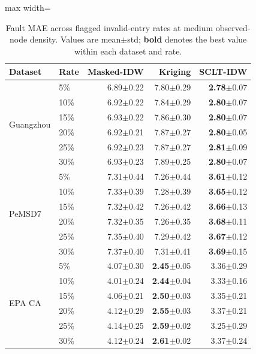 \begin{table}[htbp]
\centering
\caption{Fault MAE across flagged invalid-entry rates at medium observed-node density. Values are mean$\pm$std; \textbf{bold} denotes the best value within each dataset and rate.}
\label{tab:fault_rate_fault_mae_masked}
\TableFont
\setlength{\tabcolsep}{4pt}
\begin{adjustbox}{max width=\textwidth}
\begin{tabular}{llrrr}
\toprule
\rowcolor{TableHeader}
Dataset & Rate & Masked-IDW & Kriging & SCLT-IDW \\
\midrule
\multirow{6}{*}{Guangzhou} & 5\% & 6.89$\pm$0.22 & 7.80$\pm$0.29 & \textbf{2.78}$\pm$0.07 \\
 & 10\% & 6.92$\pm$0.22 & 7.84$\pm$0.29 & \textbf{2.80}$\pm$0.07 \\
 & 15\% & 6.93$\pm$0.22 & 7.86$\pm$0.30 & \textbf{2.80}$\pm$0.07 \\
 & 20\% & 6.92$\pm$0.21 & 7.87$\pm$0.27 & \textbf{2.80}$\pm$0.05 \\
 & 25\% & 6.92$\pm$0.23 & 7.87$\pm$0.27 & \textbf{2.81}$\pm$0.09 \\
 & 30\% & 6.93$\pm$0.23 & 7.89$\pm$0.25 & \textbf{2.80}$\pm$0.07 \\
\midrule
\multirow{6}{*}{PeMSD7} & 5\% & 7.31$\pm$0.44 & 7.26$\pm$0.44 & \textbf{3.61}$\pm$0.12 \\
 & 10\% & 7.33$\pm$0.39 & 7.28$\pm$0.39 & \textbf{3.65}$\pm$0.12 \\
 & 15\% & 7.32$\pm$0.42 & 7.26$\pm$0.42 & \textbf{3.66}$\pm$0.13 \\
 & 20\% & 7.32$\pm$0.35 & 7.26$\pm$0.35 & \textbf{3.68}$\pm$0.11 \\
 & 25\% & 7.35$\pm$0.40 & 7.29$\pm$0.42 & \textbf{3.67}$\pm$0.12 \\
 & 30\% & 7.37$\pm$0.40 & 7.31$\pm$0.41 & \textbf{3.69}$\pm$0.15 \\
\midrule
\multirow{6}{*}{EPA CA} & 5\% & 4.07$\pm$0.30 & \textbf{2.45}$\pm$0.05 & 3.36$\pm$0.29 \\
 & 10\% & 4.01$\pm$0.24 & \textbf{2.44}$\pm$0.04 & 3.33$\pm$0.16 \\
 & 15\% & 4.06$\pm$0.21 & \textbf{2.50}$\pm$0.03 & 3.35$\pm$0.21 \\
 & 20\% & 4.12$\pm$0.29 & \textbf{2.55}$\pm$0.03 & 3.37$\pm$0.21 \\
 & 25\% & 4.14$\pm$0.25 & \textbf{2.59}$\pm$0.02 & 3.25$\pm$0.29 \\
 & 30\% & 4.12$\pm$0.24 & \textbf{2.61}$\pm$0.02 & 3.37$\pm$0.24 \\
\bottomrule
\end{tabular}
\end{adjustbox}
\end{table}

